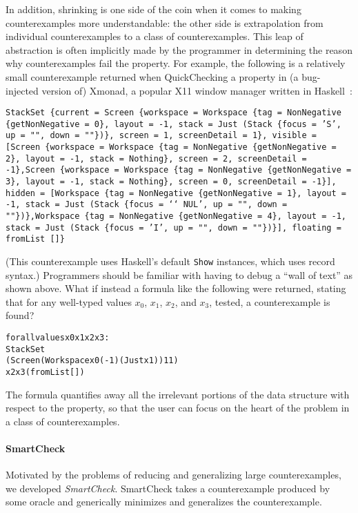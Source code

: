 \documentclass{sigplanconf}
\newenvironment{code}{\begin{alltt}\footnotesize}{\end{alltt}}
\newcommand{\ttp}[1]{\texttt{#1}}
\begin{document}
In addition, shrinking is one side of the coin when it comes to making
counterexamples more understandable: the other side is extrapolation from
individual counterexamples to a class of counterexamples.  This leap of
abstraction is often implicitly made by the programmer in determining the reason
why counterexamples fail the property.  For example, the following is a
relatively small counterexample returned when QuickChecking a property in (a
bug-injected version of) Xmonad, a popular X11 window manager written in
Haskell~\cite{xmonad}:
%
\medskip%
\begin{sloppypar}
\noindent%
\ttp{StackSet \{current = Screen \{workspace = Workspace \{tag = NonNegative
      \{getNonNegative = 0\}, layout = -1, stack = Just (Stack \{focus = 'S', up =
        "", down = ""\})\}, screen = 1, screenDetail = 1\}, visible = [Screen
    \{workspace = Workspace \{tag = NonNegative \{getNonNegative = 2\}, layout = -1,
        stack = Nothing\}, screen = 2, screenDetail = -1\},Screen \{workspace =
      Workspace \{tag = NonNegative \{getNonNegative = 3\}, layout = -1, stack =
        Nothing\}, screen = 0, screenDetail = -1\}], hidden = [Workspace \{tag =
      NonNegative \{getNonNegative = 1\}, layout = -1, stack = Just (Stack \{focus
        = `\char`\\NUL', up = "", down = ""\})\},Workspace \{tag = NonNegative
      \{getNonNegative = 4\}, layout = -1, stack = Just (Stack \{focus = 'I', up =
        "", down = ""\})\}], floating = fromList []\} }
\end{sloppypar}
\medskip%
\noindent
(This counterexample uses Haskell's default \ttp{Show} instances, which uses
record syntax.)  Programmers should be familiar with having to debug
a ``wall of text'' as shown above.  What if instead a
formula like the following were returned, stating that for any well-typed
values $x_0$, $x_1$, $x_2$, and $x_3$, tested, a counterexample is found?

%
\begin{samepage}
\begin{code}
forall values x0 x1 x2 x3:
  StackSet
    (Screen (Workspace x0 (-1) (Just x1)) 1 1)
    x2 x3 (fromList [])
\end{code}
\end{samepage}
%
\noindent
The formula quantifies away all the irrelevant portions of the data structure
with respect to the property, so that the user can focus on the heart of the
problem in a class of counterexamples.

\paragraph{SmartCheck}
Motivated by the problems of reducing and generalizing large counterexamples, we
developed \emph{SmartCheck}.  SmartCheck takes a counterexample produced by some
oracle and generically minimizes and generalizes the counterexample.
\end{document}
